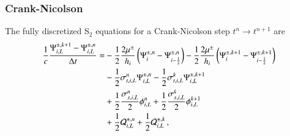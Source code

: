 \documentclass[preprint,12pt]{elsarticle}
\begin{document}
\subsubsection{Crank-Nicolson}
The fully discretized S$_2$ equations for a Crank-Nicolson step
$t^n\rightarrow t^{n+1}$ are
\begin{equation}\lequ{S2CNfullL}\begin{split}
  \frac{1}{c}\frac{\Psi\iL^{\pm,k+1}-\Psi\iL^{\pm,n}}{\dt} = &
  -\half\frac{2\mu^\pm}{h_i}\fn{\Psi^{\pm,n}_i - \Psi^{\pm,n}_{i-\half}}
  -\half\frac{2\mu^\pm}{h_i}\fn{\Psi^{\pm,k+1}_i - \Psi^{\pm,k+1}_{i-\half}}\\
  &-\half\sigma_{t,i,L}^n\Psi\iL^{\pm,n}
   -\half\sigma_{t,i,L}^k\Psi\iL^{\pm,k+1}\\
  &+\half\frac{\sigma_{s,i,L}^n}{2}\phi\iL^n
   +\half\frac{\sigma_{s,i,L}^k}{2}\phi\iL^{k+1}\\
  &+\half\Q_{i,L}^{\pm,n}
   +\half\Q_{i,L}^{\pm,k} \pec
\end{split}\end{equation}
\end{document}
